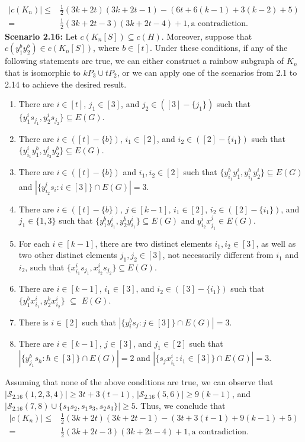 \documentclass[12pt]{article}
\begin{document}
 \begin{align*}
  |c(K_n)|\leq & \frac{1}{2}(3k+2t)(3k+2t-1)-(6t+6(k-1)+3(k-2)+5)\\
  =&\frac{1}{2}(3k+2t-3)(3k+2t-4)+1, \text{a contradiction}.
\end{align*}
{\bf Scenario 2.16:} Let \( c(K_n[S]) \subseteq c(H) \). Moreover, suppose that \( c(y^b_1y^b_2) \in c(K_n[S]) \), where \( b \in [t] \). Under these conditions, if any of the following statements are true, we can either construct a rainbow subgraph of \( K_n \) that is isomorphic to \( kP_3 \cup tP_2 \), or we can apply one of the scenarios from 2.1 to 2.14 to achieve the desired result.
\begin{enumerate}
  \item There are $i\in[t]$, $j_1\in[3]$, and $j_2\in([3]-\{j_1\})$ such that $\{y^i_1s_{j_1},y^i_2s_{j_2}\}\subseteq E(G)$.
  \item There are $i\in([t]-\{b\})$, $i_1\in[2]$, and $i_2\in([2]-\{i_1\})$ such that $\{y^i_{i_1}y^b_1,y^i_{i_2}y^b_2\}\subseteq E(G)$.
  \item There are $i\in([t]-\{b\})$ and $i_1,i_2\in[2]$ such that $\{y^b_{i_1}y^i_1,y^b_{i_1}y^i_2\}\subseteq E(G)$ and $|\{y^i_{i_2}s_i:i\in[3]\}\cap E(G)|=3$.
  \item There are $i\in([t]-\{b\})$, $j\in[k-1]$, $i_1\in[2]$, $i_2\in([2]-\{i_1\})$, and $j_1\in\{1,3\}$ such that $\{y^b_{1}y^i_{i_1},y^b_{2}y^i_{i_1}\}\subseteq E(G)$ and $y^i_{i_2}x^j_{j_1}\in E(G)$.
   \item For each \( i \in [k-1] \), there are two distinct elements \( i_1, i_2 \in [3] \), as well as two other distinct elements \( j_1, j_2 \in [3] \), not necessarily different from $i_1$ and $i_2$,   such that \( \{ x^i_{i_1} s_{j_1}, x^i_{i_2} s_{j_2} \} \subseteq E(G) \).
  \item There are $i\in[k-1]$, $i_1\in[3]$, and $i_2\in([3]-\{i_1\})$ such that $\{y^b_1x^i_{i_1},y^b_2x^i_{i_2}\}$ $\subseteq$ $E(G)$.
  \item There is $i\in[2]$ such that $|\{y^b_{i}s_j:j\in[3]\}\cap E(G)|=3$.
  \item There are  $i\in[k-1]$, $j\in[3]$, and $j_1\in[2]$ such that $|\{y^b_{j_1}s_h:h\in[3]\}\cap E(G)|=2$ and $|\{s_jx^i_{i_1}:i_1\in[3]\}\cap E(G)|=3$.
\end{enumerate}
Assuming that none of the above conditions are true, we can observe that \( |\mathcal{S}_{2.16}(1,2,3,4)| \geq 3t + 3(t-1) \), \( |\mathcal{S}_{2.16}(5,6)| \geq 9(k-1) \), and \( |\mathcal{S}_{2.16}(7,8) \cup \{s_1s_2, s_1s_3, s_2s_3\}| \geq 5 \). Thus, we conclude that
 \begin{align*}
  |c(K_n)|\leq & \frac{1}{2}(3k+2t)(3k+2t-1)-(3t+3(t-1)+9(k-1)+5)\\
  =&\frac{1}{2}(3k+2t-3)(3k+2t-4)+1, \text{a contradiction}.
\end{align*}
\end{document}
